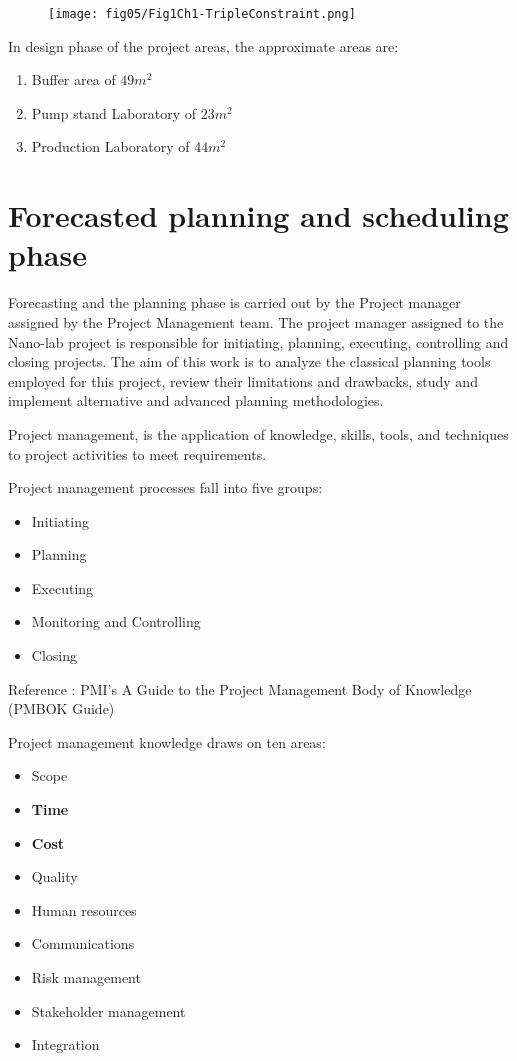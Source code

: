 \begin{figure}
	\centering
	\texttt{[image: fig05/Fig1Ch1-TripleConstraint.png]}
\end{figure}

In design phase of the project areas, the approximate areas are: 

\begin{enumerate}
	\item Buffer area of $49m^{2}$
	\item Pump stand Laboratory of $23m^{2}$
	\item Production Laboratory of $44m^{2}$
\end{enumerate}

\section {Forecasted planning and scheduling phase} 

Forecasting and the planning phase is carried out by the Project manager assigned by the Project Management team.
The project manager assigned to the Nano-lab project is responsible for initiating, planning, executing, controlling and closing projects. The aim of this work is to analyze the classical planning tools employed for this project, review their limitations and drawbacks, study and implement alternative and advanced planning methodologies. 

Project management, is the application of knowledge, skills, tools, and techniques to project activities to meet requirements.

Project management processes fall into five groups:
\begin{itemize}
	\item  Initiating
	\item  Planning
	\item  Executing
	\item  Monitoring and Controlling
	\item  Closing
	
\end{itemize}


Reference : PMI's A Guide to the Project Management Body of Knowledge (PMBOK Guide)

Project management knowledge draws on ten areas:
\begin{itemize}
	\item Scope
	\item \textbf{Time}
	\item \textbf{Cost}
	\item  Quality
	\item Human resources
	\item Communications
	\item Risk management
	\item Stakeholder management
	\item Integration
\end{itemize}

